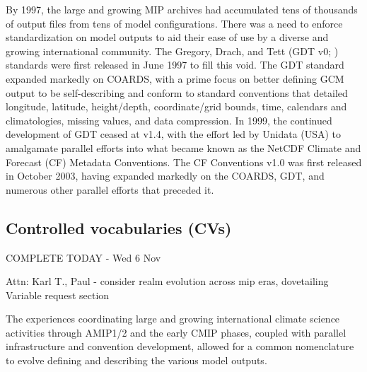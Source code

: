 \documentclass[gmd, preprint]{copernicus}
\newcommand{\mycomment}[1]{}
\def\cred#1{{\color{red}#1}}
\def\cblue#1{{\color{blue}#1}}
\begin{document}
By 1997, the large and growing MIP archives had accumulated tens of thousands of output files from tens of model configurations. There was a need to enforce standardization on model outputs to aid their ease of use by a diverse and growing international community. The Gregory, Drach, and Tett (GDT v0; \citet{gregory_gdt_1999}) standards were first released in June 1997 to fill this void. The GDT standard expanded markedly on COARDS, with a prime focus on better defining GCM output to be self-describing and conform to standard conventions that detailed longitude, latitude, height/depth, coordinate/grid bounds, time, calendars and climatologies, missing values, and data compression. In 1999, the continued development of GDT ceased at v1.4, with the effort led by Unidata (USA) to amalgamate parallel efforts into what became known as the NetCDF Climate and Forecast (CF) Metadata Conventions. The CF Conventions v1.0 was first released in October 2003, having expanded markedly on the COARDS, GDT, and numerous other parallel efforts that preceded it.


\mycomment{
https://www.unidata.ucar.edu/software/netcdf/conventions.html
https://www.unidata.ucar.edu/software/netcdf/coords/proposals.html
COARDS 1995 - https://web.archive.org/web/20100527095818/http://ferret.wrc.noaa.gov/noaa_coop/coop_cdf_profile.html
GDT 1997
https://www.unidata.ucar.edu/mailing_lists/archives/netcdfgroup/1997/msg00080.html
https://www.unidata.ucar.edu/software/netcdf/coords/0054.html 1997
https://web.archive.org/web/20100610102527/http://www-pcmdi.llnl.gov/drach/GDT_convention.html 1999
https://web.archive.org/web/20040604041414/http://www-pcmdi.llnl.gov/drach/netCDF.html
CF 2003 - https://cfconventions.org/Data/cf-conventions/cf-conventions-1.11/cf-conventions.html#_version_1_0_28_october_2003 
}


\subsection{Controlled vocabularies (CVs)}
\label{sec:CMIPCVs}
\cblue{COMPLETE TODAY - Wed 6 Nov}

\cred{Attn: Karl T., Paul - consider realm evolution across mip eras, dovetailing Variable request section}

The experiences coordinating large and growing international climate science activities through AMIP1/2 and the early CMIP phases, coupled with parallel infrastructure and convention development, allowed for a common nomenclature to evolve defining and describing the various model outputs.
\end{document}
